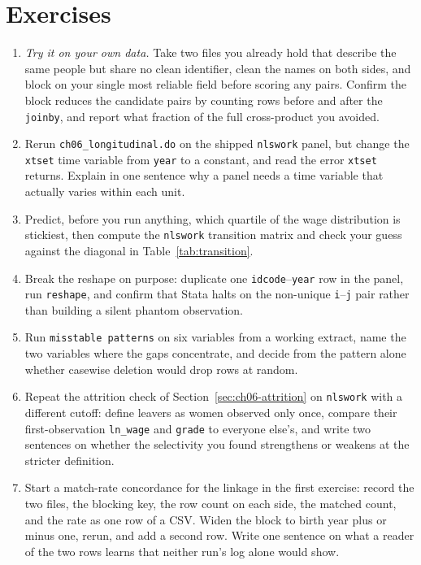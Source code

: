 \documentclass[
    a4paper,
    fontsize=10pt,
    twoside=true,
    numbers=noenddot,
]{kaobook}
\begin{document}
\section*{Exercises}
\begin{enumerate}
\item \emph{Try it on your own data.} Take two files you already hold that describe the same people but share no clean identifier, clean the names on both sides, and block on your single most reliable field before scoring any pairs. Confirm the block reduces the candidate pairs by counting rows before and after the \texttt{joinby}, and report what fraction of the full cross-product you avoided.
\item Rerun \texttt{ch06\_longitudinal.do} on the shipped \texttt{nlswork} panel, but change the \texttt{xtset} time variable from \texttt{year} to a constant, and read the error \texttt{xtset} returns. Explain in one sentence why a panel needs a time variable that actually varies within each unit.
\item Predict, before you run anything, which quartile of the wage distribution is stickiest, then compute the \texttt{nlswork} transition matrix and check your guess against the diagonal in Table~\ref{tab:transition}.
\item Break the reshape on purpose: duplicate one \texttt{idcode}--\texttt{year} row in the panel, run \texttt{reshape}, and confirm that Stata halts on the non-unique \texttt{i}--\texttt{j} pair rather than building a silent phantom observation.
\item Run \texttt{misstable patterns} on six variables from a working extract, name the two variables where the gaps concentrate, and decide from the pattern alone whether casewise deletion would drop rows at random.
\item Repeat the attrition check of Section~\ref{sec:ch06-attrition} on \texttt{nlswork} with a different cutoff: define leavers as women observed only once, compare their first-observation \texttt{ln\_wage} and \texttt{grade} to everyone else's, and write two sentences on whether the selectivity you found strengthens or weakens at the stricter definition.
\item Start a match-rate concordance for the linkage in the first exercise: record the two files, the blocking key, the row count on each side, the matched count, and the rate as one row of a CSV. Widen the block to birth year plus or minus one, rerun, and add a second row. Write one sentence on what a reader of the two rows learns that neither run's log alone would show.
\end{enumerate}
\end{document}

